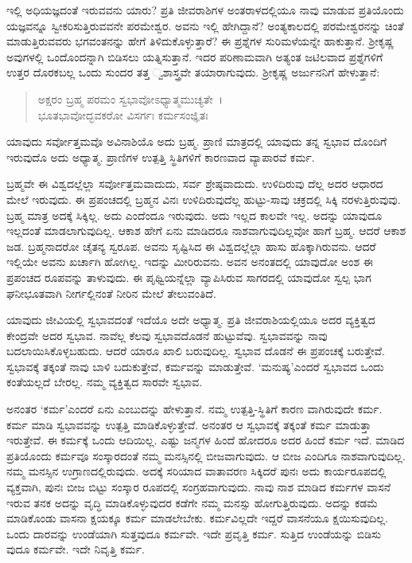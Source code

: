 ಇಲ್ಲಿ ಅಧಿಯಜ್ಞದಂತೆ ಇರುವವನು ಯಾರು? ಪ್ರತಿ ಜೀವರಾಶಿಗಳ ಅಂತರಾಳದಲ್ಲಿಯೂ ನಾವು ಮಾಡುವ ಪ್ರತಿಯೊಂದು ಯಜ್ಞವನ್ನೂ ಸ್ವೀಕರಿಸುತ್ತಿರುವವನೇ ಪರಮೇಶ್ವರ. ಅವನು ಇಲ್ಲಿ ಹೇಗಿದ್ದಾನೆ? ಅಂತ್ಯಕಾಲದಲ್ಲಿ ಪರಮೇಶ್ವರನನ್ನು ಚಿಂತೆ ಮಾಡುತ್ತಿರುವವರು ಭಗವಂತನನ್ನು ಹೇಗೆ ತಿಳಿದುಕೊಳ್ಳುತ್ತಾರೆ? ಈ ಪ್ರಶ್ನೆಗಳ ಸುರಿಮಳೆಯನ್ನೇ ಹಾಕುತ್ತಾನೆ. ಶ‍್ರೀಕೃಷ್ಣ ಅವುಗಳಲ್ಲಿ ಒಂದೊಂದನ್ನಾಗಿ ಬಿಡಿಸಲು ಯತ್ನಿಸುತ್ತಾನೆ. ಇದರ ಪರಿಣಾಮವಾಗಿ ಅತ್ಯಂತ ಜಟಿಲವಾದ ಪ್ರಶ್ನೆಗಳಿಗೆ ಉತ್ತರ ದೊರಕಬಲ್ಲ ಒಂದು ಸುಂದರ ತತ್ತ ್ವಶಾಸ್ತ್ರವೇ ತಯಾರಾಗುವುದು. ಶ‍್ರೀಕೃಷ್ಣ ಅರ್ಜುನನಿಗೆ ಹೇಳುತ್ತಾನೆ:

\begin{verse}
ಅಕ್ಷರಂ ಬ್ರಹ್ಮ ಪರಮಂ ಸ್ವಭಾವೋಽಧ್ಯಾತ್ಮಮುಚ್ಯತೇ~।\\ಭೂತಭಾವೋದ್ಭವಕರೋ ವಿಸರ್ಗಃ ಕರ್ಮಸಂಜ್ಞಿತಃ 
\end{verse}

{\small ಯಾವುದು ಸರ್ವೋತ್ತಮವೊ ಅವಿನಾಶಿಯೊ ಅದು ಬ್ರಹ್ಮ. ಪ್ರಾಣಿ ಮಾತ್ರದಲ್ಲಿ ಯಾವುದು ತನ್ನ ಸ್ವಭಾವ ದೊಂದಿಗೆ ಇರುವುದೊ ಅದು ಅಧ್ಯಾತ್ಮ. ಪ್ರಾಣಿಗಳ ಉತ್ಪತ್ತಿ ಸ್ಥಿತಿಗಳಿಗೆ ಕಾರಣವಾದ ವ್ಯಾಪಾರವೆ ಕರ್ಮ.}

ಬ್ರಹ್ಮವೇ ಈ ವಿಶ್ವದಲ್ಲೆಲ್ಲಾ ಸರ್ವೋತ್ತಮವಾದುದು, ಸರ್ವ ಶ್ರೇಷ್ಠವಾದುದು. ಉಳಿದಿರುವು ದೆಲ್ಲ ಅದರ ಆಧಾರದ ಮೇಲೆ ಇರುವುದು. ಈ ಪ್ರಪಂಚದಲ್ಲಿ ಬ್ರಹ್ಮನ ವಿನಃ ಉಳಿದಿರುವುದೆಲ್ಲ ಹುಟ್ಟು-ಸಾವು ಚಕ್ರದಲ್ಲಿ ಸಿಕ್ಕಿ ನರಳುತ್ತಿರುವುವು. ಬ್ರಹ್ಮ ಮಾತ್ರ ಅದಕ್ಕೆ ಸಿಕ್ಕಿಲ್ಲ. ಅದು ಎಂದೆಂದೂ ಇರುವುದು. ಅದು ಇಲ್ಲದ ಕಾಲವೇ ಇಲ್ಲ. ಅದನ್ನು ಯಾವುದೂ ಇಲ್ಲದಂತೆ ಮಾಡಲಾಗುವುದಿಲ್ಲ. ಆಕಾಶ ಹೇಗೆ ಏನು ಮಾಡಿದರೂ ನಾಶವಾಗುವುದಿಲ್ಲವೋ ಹಾಗೆ ಬ್ರಹ್ಮ. ಆದರೆ ಆಕಾಶ ಜಡ. ಬ್ರಹ್ಮನಾದರೋ ಚೈತನ್ಯ ಸ್ವರೂಪ. ಅವನು ಸೃಷ್ಟಿಸಿದ ಈ ವಿಶ್ವದಲ್ಲೆಲ್ಲಾ ಹಾಸು ಹೊಕ್ಕಾಗಿರುವನು. ಆದರೆ ಇಲ್ಲಿಯೇ ಅವನು ಖರ್ಚಾಗಿ ಹೋಗಿಲ್ಲ. ಇದನ್ನು ಮೀರಿರುವನು. ಅವನ ಅನಂತದಲ್ಲಿ ಯಾವುದೋ ಅಂಶ ಈ ಪ್ರಪಂಚದ ರೂಪವನ್ನು ತಾಳುವುದು. ಈ ಪೃಥ್ವಿಯನ್ನೆಲ್ಲಾ ವ್ಯಾಪಿಸಿರುವ ಸಾಗರದಲ್ಲಿ ಯಾವುದೋ ಸ್ವಲ್ಪ ಭಾಗ ಘನೀಭೂತವಾಗಿ ನೀರ್ಗಲ್ಲಿನಂತೆ ನೀರಿನ ಮೇಲೆ ತೇಲುವಂತಿದೆ.

ಯಾವುದು ಜೀವಿಯಲ್ಲಿ ಸ್ವಭಾವದಂತೆ ಇದೆಯೊ ಅದೇ ಅಧ್ಯಾತ್ಮ. ಪ್ರತಿ ಜೀವರಾಶಿಯಲ್ಲಿಯೂ ಅದರ ವ್ಯಕ್ತಿತ್ವದ ಕೇಂದ್ರವೇ ಅದರ ಸ್ವಭಾವ. ನಾವೆಲ್ಲ ಕೆಲವು ಸ್ವಭಾವದೊಡನೆ ಹುಟ್ಟುವೆವು. ಸ್ವಭಾವವನ್ನು ನಾವು ಬದಲಾಯಿಸಿಕೊಳ್ಳಬಹುದು. ಆದರೆ ಯಾರೂ ಖಾಲಿ ಬರುವುದಿಲ್ಲ. ಸ್ವಭಾವ ದೊಡನೆ ಈ ಪ್ರಪಂಚಕ್ಕೆ ಬರುತ್ತೇವೆ. ಸ್ವಭಾವಕ್ಕೆ ತಕ್ಕಂತೆ ನಾವು ಬಾಳಿ ಬದುಕುತ್ತೇವೆ, ಕರ್ಮವನ್ನು ಮಾಡುತ್ತೇವೆ. ‘ಮನುಷ್ಯ’ಎಂದರೆ ಸ್ವಭಾವದ ಒಂದು ಕಂತೆಯಲ್ಲದೆ ಬೇರಲ್ಲ. ನಮ್ಮ ವ್ಯಕ್ತಿತ್ವದ ಸಾರವೇ ಸ್ವಭಾವ.

ಅನಂತರ ‘ಕರ್ಮ’ಎಂದರೆ ಏನು ಎಂಬುದನ್ನು ಹೇಳುತ್ತಾನೆ. ನಮ್ಮ ಉತ್ಪತ್ತಿ-ಸ್ಥಿತಿಗೆ ಕಾರಣ ವಾಗಿರುವುದೇ ಕರ್ಮ. ಕರ್ಮ ಮಾಡಿ ಸ್ವಭಾವವನ್ನು ಉತ್ಪತ್ತಿ ಮಾಡಿಕೊಳ್ಳುತ್ತೇವೆ. ಅನಂತರ ಆ ಸ್ವಭಾವಕ್ಕೆ ತಕ್ಕಂತೆ ಕರ್ಮ ಮಾಡುತ್ತಾ ಇರುತ್ತೇವೆ. ಈ ಕರ್ಮಕ್ಕೆ ಒಂದು ಆದಿಯಿಲ್ಲ. ಎಷ್ಟು ಜನ್ಮಗಳ ಹಿಂದೆ ಹೋದರೂ ಅದರ ಹಿಂದೆ ಕರ್ಮ ಇದೆ. ಮಾಡಿದ ಪ್ರತಿಯೊಂದು ಕರ್ಮವೂ ಸಂಸ್ಕಾರದಂತೆ ನಮ್ಮ ಮನಸ್ಸಿನಲ್ಲಿ ಬೀಜವಾಗುವುದು. ಆ ಬೀಜ ಎಂದಿಗೂ ನಾಶವಾಗುವುದಿಲ್ಲ. ನಮ್ಮ ಮನಸ್ಸಿನ ಉಗ್ರಾಣದಲ್ಲಿರುವುದು. ಅದಕ್ಕೆ ಸರಿಯಾದ ವಾತಾವರಣ ಸಿಕ್ಕಿದರೆ ಪುನಃ ಅದು ಕಾರ್ಯರೂಪದಲ್ಲಿ ವ್ಯಕ್ತವಾಗಿ, ಪುನಃ ಬೀಜ ಬಿಟ್ಟು ಸಂಸ್ಕಾರ ರೂಪದಲ್ಲಿ ಸಂಗ್ರಹವಾಗುವುದು. ನಾವು ನಾಶ ಮಾಡಿದ ಕರ್ಮಗಳ ವಾಸನೆ ಇರುವ ತನಕ ಅದನ್ನು ವೃದ್ಧಿ ಮಾಡಿಕೊಳ್ಳುವುದರ ಕಡೆಗೇ ನಮ್ಮ ಮನಸ್ಸು ಹೋಗುತ್ತಿರುವುದು. ಅದನ್ನು ಕಡಮೆ ಮಾಡಿಕೊಂಡು ವಾಸನಾ ಕ್ಷಯಕ್ಕೂ ಕರ್ಮ ಮಾಡಲೇಬೇಕು. ಕರ್ಮವಿಲ್ಲದೇ ಇದ್ದರೆ ವಾಸನೆಯೂ ಕ್ಷಯಿಸುವುದಿಲ್ಲ. ಒಂದು ದಾರವನ್ನು ಉಂಡೆಯಾಗಿ ಸುತ್ತವುದೂ ಕರ್ಮವೇ. ಇದೇ ಪ್ರವೃತ್ತಿ ಕರ್ಮ. ಸುತ್ತಿದ ಉಂಡೆಯನ್ನು ಬಿಡಿಸು ವುದೂ ಕರ್ಮವೇ. ಇದೇ ನಿವೃತ್ತಿ ಕರ್ಮ.

